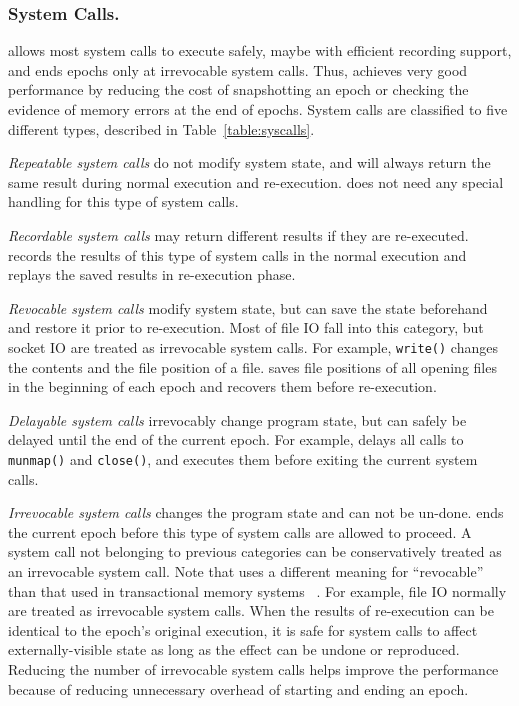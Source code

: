 \subsubsection{System Calls.}
\label{sec:syscall}



\doubletake{} allows most system calls to execute safely, maybe with efficient recording support, and ends epochs only at irrevocable system calls. Thus, \doubletake{} achieves very good performance by reducing the cost of snapshotting an epoch or checking the evidence of memory errors at the end of epochs. 
System calls are classified to five different types, described in Table~\ref{table:syscalls}.

\emph{Repeatable system calls} do not modify system state, and will always return the same result during normal execution and  re-execution. \doubletake{} does not need any special handling for this type of system calls.

\emph{Recordable system calls} may return different results if they are re-executed.
\doubletake{} records the results of this type of system calls in the normal execution and replays the saved results in re-execution phase. 

\emph{Revocable system calls} modify system state, but \doubletake{} can save the state beforehand and restore it prior to re-execution. Most of file IO fall into this category, but socket IO are treated as irrevocable system calls. For example, \texttt{write()} changes the contents and the file position of a file. \doubletake{} saves file positions of all opening files in the beginning of each epoch and recovers them before re-execution. 

\emph{Delayable system calls} irrevocably change program state, but can safely be delayed until the end of the current epoch. For example, \doubletake{} delays all calls to \texttt{munmap()} and \texttt{close()}, and executes them before exiting the current system calls. 

\emph{Irrevocable system calls} changes the program state and can not be un-done. \doubletake{} ends the current epoch before this type of system calls are allowed to proceed. A system call not belonging to previous categories can be conservatively treated as an irrevocable system call. Note that \doubletake{} uses a different meaning for ``revocable'' than that used in transactional memory systems ~\cite{Irrevocabletrans}. For example, file IO normally are treated as irrevocable system calls. When the results of re-execution can be identical to the epoch’s original
execution, it is safe for system calls to affect externally-visible state as long as the effect can be undone or reproduced. Reducing the number of irrevocable system calls helps improve the performance because of reducing unnecessary overhead of starting and ending an epoch. 

